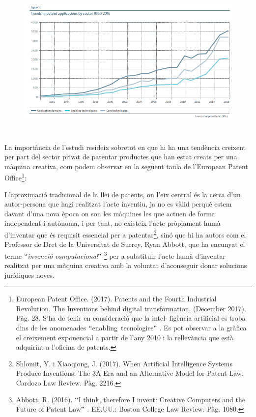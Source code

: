 \documentclass[12pt]{article}
\begin{document}
\vspace{\baselineskip}



\begin{figure}[H]
\advance\leftskip -0.31in		\includegraphics[width=6.0in,height=3.0in]{./media/image3.png}
\end{figure}



\begin{justify}
La importància de l’estudi resideix sobretot en que hi ha una tendència creixent per part del sector privat de patentar productes que han estat creats per una màquina creativa, com podem observar en la següent taula de l’European Patent Office\footnote{ European Patent Office. (2017). Patents and the Fourth Industrial Revolution. The Inventions behind digital transformation. (December 2017). Pàg. 28. S’ha de tenir en consideració que la intel$ \cdot $ ligència artificial es troba dins de les anomenades $``$enabling\ tecnologies$"$ . Es pot observar  a la gràfica el creixement exponencial a partir de l’any 2010 i la rellevància que està adquirint a l’oficina de patents.  }:
\end{justify}\par

\begin{justify}
L’aproximació tradicional de la llei de patents, on l’eix central és la cerca d’un autor-persona que hagi realitzat l’acte inventiu, ja no es vàlid perquè estem davant d’una nova època on son les màquines les que actuen de forma independent i autònoma, i per tant, no existeix l’acte pròpiament humà d’inventar que és requisit essencial per a patentar\footnote{ Shlomit, Y. i Xiaoqiong, J. (2017).  When Artificial Intelligence Systems Produce Inventions: The 3A Era and an Alternative Model for Patent Law. Cardozo Law Review. Pàg. 2216.  }, sinó que hi ha autors com el Professor de Dret de la Universitat de Surrey, Ryan Abbott, que ha encunyat el terme $``$\textit{invenció computacional}$"$ \footnote{ Abbott, R. (2016). $``$I think, therefore I invent: Creative Computers and the Future of Patent Law$"$ . EE.UU.: Boston College Law Review. Pàg. 1080.  } per a substituir l’acte humà d’inventar realitzat per una màquina creativa amb la voluntat d’aconseguir donar solucions jurídiques noves. 
\end{justify}\par
\end{document}
